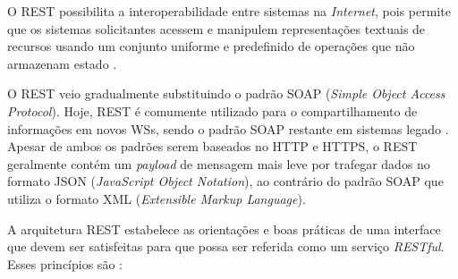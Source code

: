 O REST possibilita a interoperabilidade entre sistemas na \textit{Internet}, pois permite que os sistemas solicitantes acessem e manipulem representações textuais de recursos usando um conjunto uniforme e predefinido de operações que não armazenam estado \cite{booth2004webservice}.

O REST veio gradualmente substituindo o padrão SOAP (\textit{Simple Object Access Protocol}). Hoje, REST é comumente utilizado para o compartilhamento de informações em novos WSs, sendo o padrão SOAP restante em sistemas legado \cite{serrano2014soaplegacy}. Apesar de ambos os padrões serem baseados no HTTP e HTTPS, o REST geralmente contém um \textit{payload} de mensagem mais leve por trafegar dados no formato JSON (\textit{JavaScript Object Notation}), ao contrário do padrão SOAP que utiliza o formato XML (\textit{Extensible Markup Language}).

A arquitetura REST estabelece as orientações e boas práticas de uma interface que devem ser satisfeitas para que possa ser referida como um serviço \textit{RESTful}. Esses princípios são \cite{fielding2000rest}:

